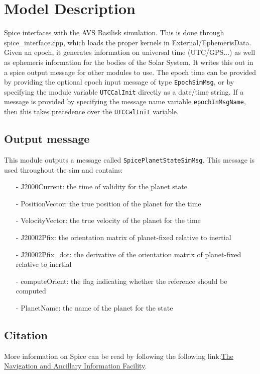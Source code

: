\section{Model Description}


Spice interfaces with the AVS Basilisk simulation. This is done through spice\_interface.cpp, which loads the proper kernels in External/EphemerisData. Given an epoch, it generates information on universal time (UTC/GPS...) as well as ephemeris information for the bodies of the Solar System. It writes this out in a spice output message for other modules to use.  The epoch time can be provided by providing the optional epoch input message of type {\tt EpochSimMsg}, or by specifying the module variable {\tt UTCCalInit} directly as a date/time string.  If a message is provided by specifying the message name variable {\tt epochInMsgName}, then this takes precedence over the {\tt UTCCalInit} variable.  

\subsection{Output message}

This module outputs a message called \texttt{SpicePlanetStateSimMsg}. This message is used throughout the sim and contains:

\begin{itemize}
    \item[-] J2000Current: the time of validity for the planet state
    \item[-] PositionVector: the true position of the planet for the time
    \item[-] VelocityVector: the true velocity of the planet for the time
    \item[-] J20002Pfix: the orientation matrix of planet-fixed relative to inertial
    \item[-] J20002Pfix\_dot: the derivative of the orientation matrix of planet-fixed relative to inertial
    \item[-] computeOrient: the flag indicating whether the reference should be computed
    \item[-] PlanetName: the name of the planet for the state
\end{itemize}

\subsection{Citation}

More information on Spice can be read by following the following link:\href{ \underline{https://naif.jpl.nasa.gov/naif/spiceconcept.html}}{The Navigation and Ancillary Information Facility}. 

